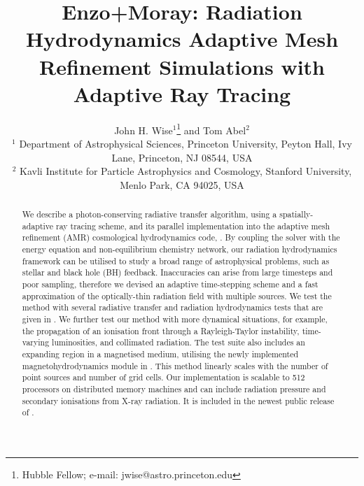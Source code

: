 \documentclass[useAMS,usenatbib]{mn2e}
\begin{document}
\title[AMR Simulations with Adaptive Ray Tracing] {Enzo+Moray:
  Radiation Hydrodynamics Adaptive Mesh Refinement Simulations with
  Adaptive Ray Tracing}

\author[J. H. Wise and T. Abel] {John H. Wise$^1$\thanks{Hubble
    Fellow; e-mail: jwise@astro.princeton.edu} and Tom Abel$^2$\\
$^{1}$ Department of Astrophysical Sciences, Princeton University,
Peyton Hall, Ivy Lane, Princeton, NJ 08544, USA\\
$^{2}$ Kavli Institute for Particle Astrophysics and Cosmology,
Stanford University, Menlo Park, CA 94025, USA}

\pagerange{\pageref{firstpage}--\pageref{lastpage}} 

\maketitle
\label{firstpage}

\begin{abstract}

  We describe a photon-conserving radiative transfer algorithm, using
  a spatially-adaptive ray tracing scheme, and its parallel
  implementation into the adaptive mesh refinement (AMR) cosmological
  hydrodynamics code, \enzo.  By coupling the solver with the energy
  equation and non-equilibrium chemistry network, our radiation
  hydrodynamics framework can be utilised to study a broad range of
  astrophysical problems, such as stellar and black hole (BH)
  feedback.  Inaccuracies can arise from large timesteps and poor
  sampling, therefore we devised an adaptive time-stepping scheme and
  a fast approximation of the optically-thin radiation field with
  multiple sources.  We test the method with several radiative
  transfer and radiation hydrodynamics tests that are given in
  \citet{RT06, Iliev09}.  We further test our method with more
  dynamical situations, for example, the propagation of an ionisation
  front through a Rayleigh-Taylor instability, time-varying
  luminosities, and collimated radiation.  The test suite also
  includes an expanding \hii region in a magnetised medium, utilising
  the newly implemented magnetohydrodynamics module in \enzo.  This
  method linearly scales with the number of point sources and number
  of grid cells.  Our implementation is scalable to 512 processors on
  distributed memory machines and can include radiation pressure and
  secondary ionisations from X-ray radiation.  It is included in the
  newest public release of \enzo.
  
\end{abstract}
\end{document}
